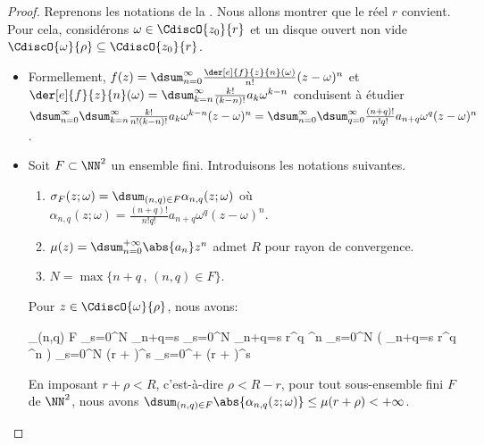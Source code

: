 \begin{proof}
    Reprenons les notations de la .
    Nous allons montrer que le réel $r$ convient.
    Pour cela, considérons $\omega \in \CdiscO{z_0}{r}$
    et
    un disque ouvert non vide $\CdiscO{\omega}{\rho} \subseteq \CdiscO{z_0}{r}$.
	\begin{itemize}
		\item Formellement,
		$f(z) = \dsum_{n = 0}^{\infty} \frac{\der[e]{f}{z}{n}(\omega)}{n!} (z - \omega)^n$
		et
		$\der[e]{f}{z}{n}(\omega) = \dsum_{k = n}^{\infty} \frac{k!}{(k-n)!} a_k \omega^{k - n}$
		conduisent à étudier
		$ \dsum_{n = 0}^{\infty} \dsum_{k = n}^{\infty} \frac{k!}{n! (k-n)!} a_k \omega^{k - n} (z - \omega)^n
		= \dsum_{n = 0}^{\infty} \dsum_{q = 0}^{\infty} \frac{(n+q)!}{n! q!} a_{n+q} \omega^q (z - \omega)^n$.
	

		\item Soit $F \subset \NN^2$ un ensemble fini.
		Introduisons les notations suivantes.
		\begin{enumerate}
			\item $\sigma_F(z ; \omega) = \dsum_{(n,q) \in F} \alpha_{n,q}(z ; \omega)$
			où
			$\alpha_{n,q}(z ; \omega) = \frac{(n+q)!}{n! q!} a_{n+q} \omega^q (z - \omega)^n$.

			\item $\mu(z) = \dsum_{n = 0}^{+\infty} \abs{a_n} z^n$ admet $R$ pour rayon de convergence.

			\item $N = \max \big\{ n + q \,,\, (n,q) \in F \big\}$.
		\end{enumerate}
		
		\noindent
		Pour $z \in \CdiscO{\omega}{\rho}$, nous avons:
		
		\noindent\kern-6pt
		\begin{stepcalc}[style=sar, ope=\leq]
			\dsum_{(n,q) \in F} 
		\explnext{}
			\dsum_{s=0}^{N} \dsum_{n+q=s} 
		\explnext{}
			\dsum_{s=0}^{N} \dsum_{n+q=s}   r^q \rho^n
		\explnext{}
			\dsum_{s=0}^{N}  \big( \dsum_{n+q=s}  r^q \rho^n \big)
		\explnext{}
			\dsum_{s=0}^{N}  (r + \rho)^s
		\explnext{}
			\dsum_{s=0}^{+\infty}  (r + \rho)^s
		\end{stepcalc}
		
		\noindent
		En imposant $r + \rho < R$, c'est-à-dire $\rho < R - r$, 
		pour tout sous-ensemble fini $F$ de $\NN^2$, nous avons
		$\dsum_{(n,q) \in F} \abs{\alpha_{n,q}(z ; \omega)} \leq \mu(r + \rho) < +\infty$.
		

\end{itemize}
\end{proof}
